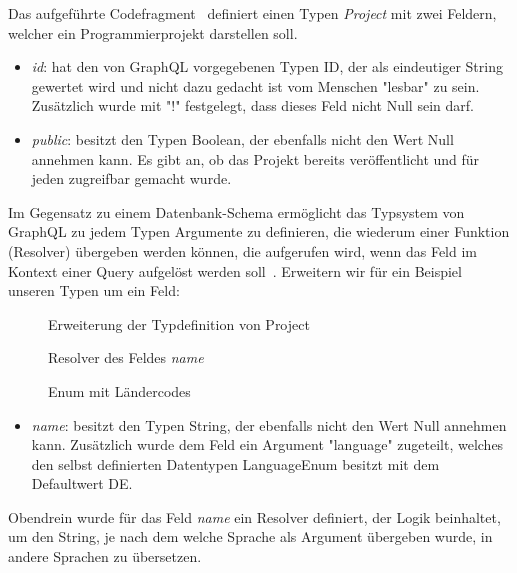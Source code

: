 Das aufgeführte Codefragment~ definiert einen Typen \emph{Project} mit zwei Feldern, welcher ein Programmierprojekt darstellen soll.
\begin{itemize}
    \item \emph{id}: hat den von GraphQL vorgegebenen Typen ID, der als eindeutiger String gewertet wird und nicht dazu gedacht ist vom Menschen "lesbar" zu sein.
    Zusätzlich wurde mit "!" festgelegt, dass dieses Feld nicht Null sein darf.
    \item \emph{public}: besitzt den Typen Boolean, der ebenfalls nicht den Wert Null annehmen kann.
    Es gibt an, ob das Projekt bereits veröffentlicht und für jeden zugreifbar gemacht wurde.
\end{itemize}

Im Gegensatz zu einem Datenbank-Schema ermöglicht das Typsystem von GraphQL zu jedem Typen Argumente zu definieren,
die wiederum einer Funktion (Resolver) übergeben werden können,
die aufgerufen wird, wenn das Feld im Kontext einer Query aufgelöst werden soll~\cite{graphql-resolver}.
Erweitern wir für ein Beispiel unseren Typen um ein Feld:

\begin{figure}[h]
    
    \caption{Erweiterung der Typdefinition von Project}
    \label{fig:basics:graphql:3}
\end{figure}

\begin{figure}[h]
    
    \caption{Resolver des Feldes \emph{name}}
    \label{fig:basics:graphql:4}
\end{figure}

\begin{figure}[h]
    
    \caption{Enum mit Ländercodes}
    \label{fig:basics:graphql:2}
\end{figure}

\begin{itemize}
    \item \emph{name}: besitzt den Typen String, der ebenfalls nicht den Wert Null annehmen kann. Zusätzlich wurde dem Feld ein Argument "language" zugeteilt,
    welches den selbst definierten Datentypen LanguageEnum besitzt mit dem Defaultwert DE.
\end{itemize}

Obendrein wurde für das Feld \emph{name} ein Resolver definiert, der Logik beinhaltet, um den String, je nach dem welche Sprache als Argument übergeben wurde,
in andere Sprachen zu übersetzen.

